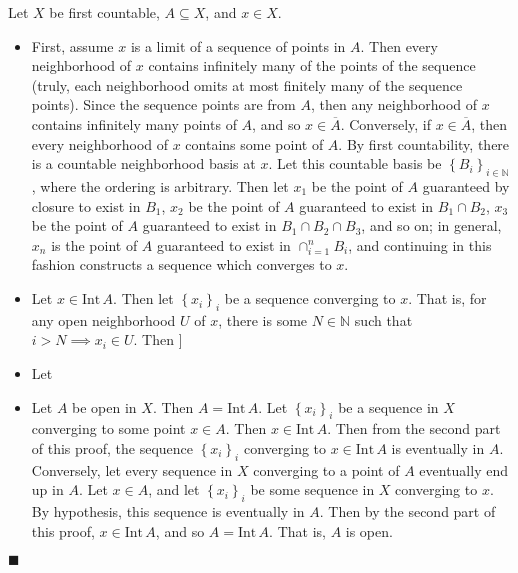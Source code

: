 \documentclass[12pt]{article}
\renewcommand{\qed}{\hfill$\blacksquare$}
\renewenvironment{proof}{\begin{addmargin}[1em]{0em}\begin{newproof}}{\end{newproof}\end{addmargin}\qed}
\begin{document}
\begin{proof}
Let $X$ be first countable, $A\subseteq X$, and $x\in X$.
\begin{itemize}
	\item First, assume $x$ is a limit of a sequence of points in $A$. Then every neighborhood of $x$ contains infinitely many of the points of the sequence (truly, each neighborhood omits at most finitely many of the sequence points). Since the sequence points are from $A$, then any neighborhood of $x$ contains infinitely many points of $A$, and so $x\in \overline{A}$. Conversely, if $x\in \overline{A}$, then every neighborhood of $x$ contains some point of $A$. By first countability, there is a countable neighborhood basis at $x$. Let this countable basis be $\left\{B_i\right\}_{i \in \mathbb{N}}$, where the ordering is arbitrary. Then let $x_1$ be the point of $A$ guaranteed by closure to exist in $B_1$, $x_2$ be the point of $A$ guaranteed to exist in $B_1\cap B_2$, $x_3$ be the point of $A$ guaranteed to exist in $B_1\cap B_2 \cap B_3$, and so on; in general, $x_n $ is the point of $A$ guaranteed to exist in $\cap_{i=1}^n B_i$, and continuing in this fashion constructs a sequence which converges to $x$.
	\item Let $x \in \text{Int}\,A$. Then let $\left\{x_i\right\}_i$ be a sequence converging to $x$. That is, for any open neighborhood $U$ of $x$, there is some $N\in \mathbb{N}$ such that $i>N \implies x_i \in U$. Then ]
	\item Let 
	\item Let $A$ be open in $X$. Then $A=\text{Int}\, A$. Let $\left\{x_i\right\}_i$ be a sequence in $X$ converging to some point $x \in A$. Then $x\in \text{Int}\,A$. Then from the second part of this proof, the sequence $\left\{x_i\right\}_i$ converging to $x \in \text{Int}\, A$ is eventually in $A$. Conversely, let every sequence in $X$ converging to a point of $A$ eventually end up in $A$. Let $x \in A$, and let $\left\{x_i\right\}_i$ be some sequence in $X$ converging to $x$. By hypothesis, this sequence is eventually in $A$. Then by the second part of this proof, $x\in \text{Int}\,A$, and so $A=\text{Int}\,A$. That is, $A$ is open.
\end{itemize}
\end{proof}
\end{document}
